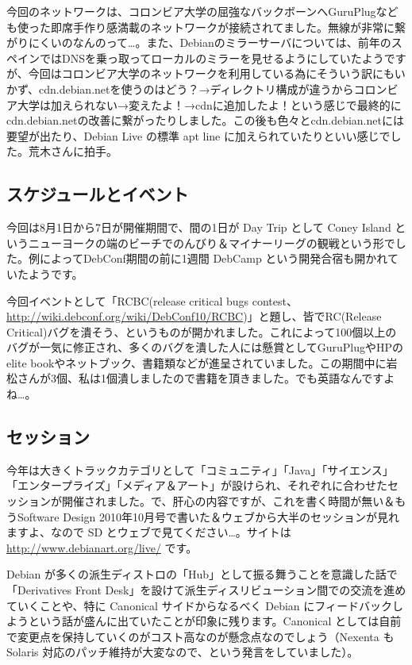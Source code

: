 \documentclass[mingoth,a4paper]{jsarticle}
\begin{document}
今回のネットワークは、コロンビア大学の屈強なバックボーンへGuruPlugなども使った即席手作り感満載のネットワークが接続されてました。無線が非常に繋がりにくいのなんのって…。また、Debianのミラーサーバについては、前年のスペインではDNSを乗っ取ってローカルのミラーを見せるようにしていたようですが、今回はコロンビア大学のネットワークを利用している為にそういう訳にもいかず、cdn.debian.netを使うのはどう？→ディレクトリ構成が違うからコロンビア大学は加えられない→変えたよ！→cdnに追加したよ！という感じで最終的にcdn.debian.netの改善に繋がったりしました。この後も色々とcdn.debian.netには要望が出たり、Debian Live の標準 apt line に加えられていたりといい感じでした。荒木さんに拍手。

\subsection{スケジュールとイベント}
今回は8月1日から7日が開催期間で、間の1日が Day Trip として Coney Island というニューヨークの端のビーチでのんびり＆マイナーリーグの観戦という形でした。例によってDebConf期間の前に1週間 DebCamp という開発合宿も開かれていたようです。

今回イベントとして「RCBC(release critical bugs contest、\url{http://wiki.debconf.org/wiki/DebConf10/RCBC})」と題し、皆でRC(Release Critical)バグを潰そう、というものが開かれました。これによって100個以上のバグが一気に修正され、多くのバグを潰した人には懸賞としてGuruPlugやHPのelite bookやネットブック、書籍類などが進呈されていました。この期間中に岩松さんが3個、私は1個潰しましたので書籍を頂きました。でも英語なんですよね…。

\subsection{セッション}

今年は大きくトラックカテゴリとして「コミュニティ」「Java」「サイエンス」「エンタープライズ」「メディア＆アート」が設けられ、それぞれに合わせたセッションが開催されました。で、肝心の内容ですが、これを書く時間が無い＆もうSoftware Design 2010年10月号で書いた＆ウェブから大半のセッションが見れますよ、なので SD とウェブで見てください…。サイトは \url{http://www.debianart.org/live/} です。

Debian が多くの派生ディストロの「Hub」として振る舞うことを意識した話で「Derivatives Front Desk」を設けて派生ディスリビューション間での交流を進めていくことや、特に Canonical サイドからなるべく Debian にフィードバックしようという話が盛んに出ていたことが印象に残ります。Canonical としては自前で変更点を保持していくのがコスト高なのが懸念点なのでしょう（Nexenta も Solaris 対応のパッチ維持が大変なので、という発言をしていました）。
\end{document}

